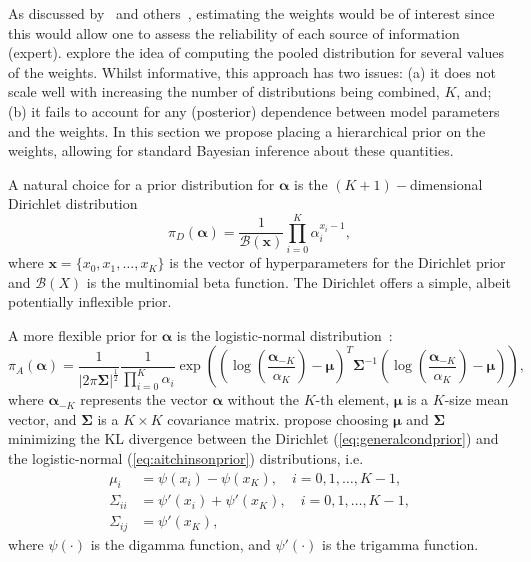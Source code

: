 \documentclass[a4paper, notitlepage, 10pt]{article}
\begin{document}
As discussed by~\cite{poole2000} and others~\citep{zhong2015,li2017}, estimating the weights would be of interest since this would allow one to assess the reliability of each source of information (expert).
\cite{li2017} explore the idea of computing the pooled distribution for several values of the weights.
Whilst informative, this approach has two issues: (a) it does not scale well with increasing the number of distributions being combined, $K$, and; (b) it fails to account for any (posterior) dependence between model parameters and the weights.
In this section we propose placing a hierarchical prior on the weights, allowing for standard Bayesian inference about these quantities.

A natural choice for a prior distribution for $\boldsymbol\alpha$ is the $(K+1)-$dimensional Dirichlet distribution
\begin{equation}
 \label{eq:generalcondprior}
 \pi_D(\boldsymbol\alpha) = \frac{1}{\mathcal{B}(\boldsymbol x)}\prod_{i=0}^K \alpha_i^{x_i-1},
\end{equation}
where $\boldsymbol x = \{ x_0, x_1, \ldots, x_K\}$ is the vector of hyperparameters for the Dirichlet prior and $\mathcal{B}(X)$ is the multinomial beta function.
The Dirichlet offers a simple, albeit potentially inflexible prior.

A more flexible prior for $\boldsymbol\alpha$ is the logistic-normal distribution~\citep{aitchson1980}:
\begin{equation}
 \label{eq:aitchinsonprior}
 \pi_A(\boldsymbol\alpha) = \frac{1}{|2\pi \boldsymbol \Sigma|^{\frac{1}{2}}}\frac{1}{\prod_{i=0}^K \alpha_i}
  \exp\left(
     \left(\log\left(\frac{\boldsymbol \alpha_{-K}}{\alpha_K}\right) - \boldsymbol \mu\right)^T
     {\boldsymbol \Sigma}^{-1}
     \left(\log\left(\frac{\boldsymbol \alpha_{-K}}{\alpha_K}\right) - \boldsymbol \mu\right)
     \right),
\end{equation}
where $\boldsymbol \alpha_{-K}$ represents the vector $\boldsymbol \alpha$ without the $K$-th element, $\boldsymbol \mu$ is a $K$-size mean vector, and $\boldsymbol \Sigma$ is a $K \times K$ covariance matrix.
\citet{aitchson1980} propose choosing $\boldsymbol \mu$ and $\boldsymbol \Sigma$ minimizing the KL divergence between the Dirichlet (\ref{eq:generalcondprior}) and the logistic-normal (\ref{eq:aitchinsonprior}) distributions, i.e.
\begin{align}
 \label{eq:momentmatching}
 \mu_i & = \psi(x_i) - \psi(x_K), \quad i=0,1,\ldots,K-1, \\
 \Sigma_{ii} & = \psi'(x_i) + \psi'(x_K), \quad i=0,1,\ldots,K-1, \\
 \Sigma_{ij} & = \psi'(x_K),
\end{align}
where $\psi(\cdot)$ is the digamma function, and $\psi'(\cdot)$ is the trigamma function.
\end{document}
